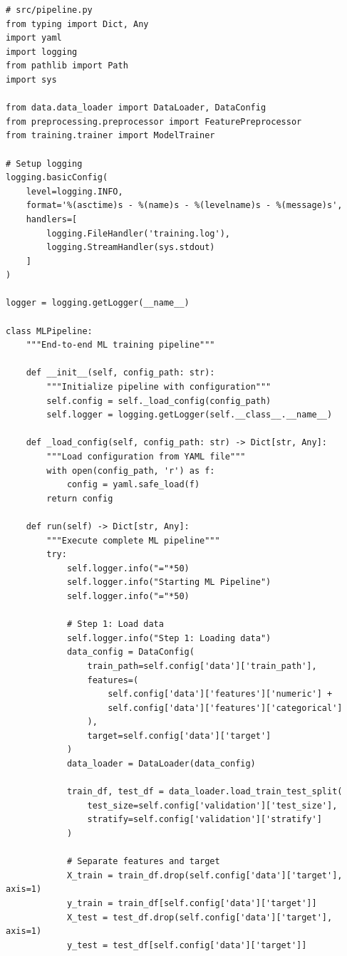 \begin{lstlisting}[style=python, caption=Production ML Pipeline - Main Pipeline]
# src/pipeline.py
from typing import Dict, Any
import yaml
import logging
from pathlib import Path
import sys

from data.data_loader import DataLoader, DataConfig
from preprocessing.preprocessor import FeaturePreprocessor
from training.trainer import ModelTrainer

# Setup logging
logging.basicConfig(
    level=logging.INFO,
    format='%(asctime)s - %(name)s - %(levelname)s - %(message)s',
    handlers=[
        logging.FileHandler('training.log'),
        logging.StreamHandler(sys.stdout)
    ]
)

logger = logging.getLogger(__name__)

class MLPipeline:
    """End-to-end ML training pipeline"""

    def __init__(self, config_path: str):
        """Initialize pipeline with configuration"""
        self.config = self._load_config(config_path)
        self.logger = logging.getLogger(self.__class__.__name__)

    def _load_config(self, config_path: str) -> Dict[str, Any]:
        """Load configuration from YAML file"""
        with open(config_path, 'r') as f:
            config = yaml.safe_load(f)
        return config

    def run(self) -> Dict[str, Any]:
        """Execute complete ML pipeline"""
        try:
            self.logger.info("="*50)
            self.logger.info("Starting ML Pipeline")
            self.logger.info("="*50)

            # Step 1: Load data
            self.logger.info("Step 1: Loading data")
            data_config = DataConfig(
                train_path=self.config['data']['train_path'],
                features=(
                    self.config['data']['features']['numeric'] +
                    self.config['data']['features']['categorical']
                ),
                target=self.config['data']['target']
            )
            data_loader = DataLoader(data_config)

            train_df, test_df = data_loader.load_train_test_split(
                test_size=self.config['validation']['test_size'],
                stratify=self.config['validation']['stratify']
            )

            # Separate features and target
            X_train = train_df.drop(self.config['data']['target'], axis=1)
            y_train = train_df[self.config['data']['target']]
            X_test = test_df.drop(self.config['data']['target'], axis=1)
            y_test = test_df[self.config['data']['target']]


\end{lstlisting}

